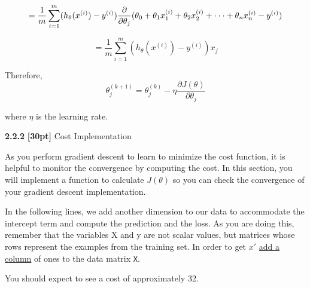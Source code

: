 \documentclass[11pt]{article}
\begin{document}
\[
= 
\frac{1}{m}\sum_{i=1}^{m}(h_{\theta}(x^{(i)}) - y^{(i)})\frac{\partial }{\partial \theta_j}(\theta_{0} + \theta_{1}x_1^{(i)} + \theta_2 x_2^{(i)} + \cdot \cdot \cdot + \theta_n x_n^{(i)} - y^{(i)})\\
\]

\[
= \frac{1}{m}\sum_{i=1}^{m}(h_{\theta}(x^{(i)}) - y^{(i)})x_j
\]

Therefore,
\[\theta_j^{(k+1)} = \theta_j^{(k)} - \eta \frac{\partial J(\theta)}{\partial \theta_j}\]

where \(\eta\) is the learning rate.

\textbf{2.2.2} \textbf{{[}30pt{]}} Cost Implementation

As you perform gradient descent to learn to minimize the cost function,
it is helpful to monitor the convergence by computing the cost. In this
section, you will implement a function to calculate \(J(\theta)\) so you
can check the convergence of your gradient descent implementation.

In the following lines, we add another dimension to our data to
accommodate the intercept term and compute the prediction and the loss.
As you are doing this, remember that the variables X and y are not
scalar values, but matrices whose rows represent the examples from the
training set. In order to get \(x'\)
\href{https://docs.scipy.org/doc/numpy/reference/generated/numpy.insert.html}{add
a column} of ones to the data matrix \texttt{X}.

You should expect to see a cost of approximately 32.
\end{document}
